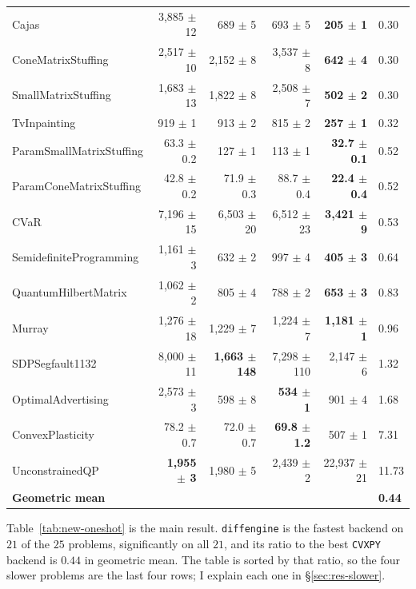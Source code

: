\documentclass[letterpaper,12pt]{article}
\begin{document}
\begin{table}[htbp]
{\begin{tabular}{l r r r r l}
Cajas                       & 3{,}885 $\pm$ 12 & 689 $\pm$ 5 & 693 $\pm$ 5 & \textbf{205 $\pm$ 1} & 0.30 \\
ConeMatrixStuffing          & 2{,}517 $\pm$ 10 & 2{,}152 $\pm$ 8 & 3{,}537 $\pm$ 8 & \textbf{642 $\pm$ 4} & 0.30 \\
SmallMatrixStuffing         & 1{,}683 $\pm$ 13 & 1{,}822 $\pm$ 8 & 2{,}508 $\pm$ 7 & \textbf{502 $\pm$ 2} & 0.30 \\
TvInpainting                & 919 $\pm$ 1 & 913 $\pm$ 2 & 815 $\pm$ 2 & \textbf{257 $\pm$ 1} & 0.32 \\
ParamSmallMatrixStuffing    & 63.3 $\pm$ 0.2 & 127 $\pm$ 1 & 113 $\pm$ 1 & \textbf{32.7 $\pm$ 0.1} & 0.52 \\
ParamConeMatrixStuffing     & 42.8 $\pm$ 0.2 & 71.9 $\pm$ 0.3 & 88.7 $\pm$ 0.4 & \textbf{22.4 $\pm$ 0.4} & 0.52 \\
CVaR                        & 7{,}196 $\pm$ 15 & 6{,}503 $\pm$ 20 & 6{,}512 $\pm$ 23 & \textbf{3{,}421 $\pm$ 9} & 0.53 \\
SemidefiniteProgramming     & 1{,}161 $\pm$ 3 & 632 $\pm$ 2 & 997 $\pm$ 4 & \textbf{405 $\pm$ 3} & 0.64 \\
QuantumHilbertMatrix        & 1{,}062 $\pm$ 2 & 805 $\pm$ 4 & 788 $\pm$ 2 & \textbf{653 $\pm$ 3} & 0.83 \\
Murray                      & 1{,}276 $\pm$ 18 & 1{,}229 $\pm$ 7 & 1{,}224 $\pm$ 7 & \textbf{1{,}181 $\pm$ 1} & 0.96 \\
SDPSegfault1132             & 8{,}000 $\pm$ 11 & \textbf{1{,}663 $\pm$ 148} & 7{,}298 $\pm$ 110 & 2{,}147 $\pm$ 6 & 1.32 \\
OptimalAdvertising          & 2{,}573 $\pm$ 3 & 598 $\pm$ 8 & \textbf{534 $\pm$ 1} & 901 $\pm$ 4 & 1.68 \\
ConvexPlasticity            & 78.2 $\pm$ 0.7 & 72.0 $\pm$ 0.7 & \textbf{69.8 $\pm$ 1.2} & 507 $\pm$ 1 & 7.31 \\
UnconstrainedQP             & \textbf{1{,}955 $\pm$ 3} & 1{,}980 $\pm$ 5 & 2{,}439 $\pm$ 2 & 22{,}937 $\pm$ 21 & 11.73 \\
\midrule
\textbf{Geometric mean}     &       &       &       &       & \textbf{0.44} \\
\bottomrule
\end{tabular}}
\end{table}

Table~\ref{tab:new-oneshot} is the main result. \texttt{diffengine} is the fastest backend on
$21$ of the $25$ problems, significantly on all $21$, and its ratio to the best \texttt{CVXPY}
backend is $0.44$ in geometric mean. The table is sorted by that ratio, so the four slower
problems are the last four rows; I explain each one in \S\ref{sec:res-slower}.
\end{document}
